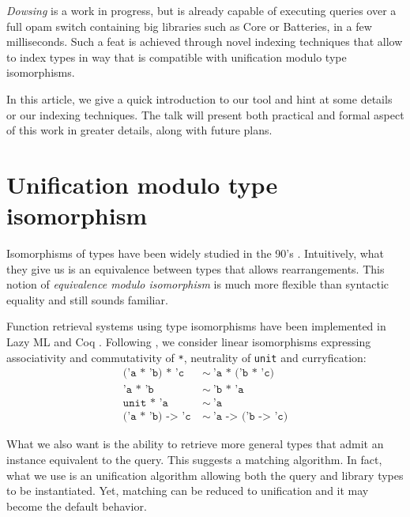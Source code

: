 \documentclass [a4paper,11pt] {scrartcl}
\newcommand {\dowsing} {\textit {Dowsing}\xspace}
\begin{document}
\dowsing is a work in progress, but is already capable of
executing queries over a full opam switch
containing big libraries such as Core or Batteries, in a few milliseconds.
Such a feat is achieved through novel indexing techniques that allow
to index types in way that is compatible with unification modulo type
isomorphisms.

In this article, we give a quick introduction to our tool and hint at some
details or our indexing techniques. The talk will present both practical
and formal aspect of this work in greater details, along with
future plans.



\section {Unification modulo type isomorphism}

Isomorphisms of types have been widely studied in the 90's \cite {dicosmo}. Intuitively, what they give us is an equivalence between types that allows rearrangements. This notion of \textit {equivalence modulo isomorphism} is much more flexible than syntactic equality and still sounds familiar.

Function retrieval systems using type isomorphisms have been implemented in Lazy ML \cite {rittri} and Coq \cite {delahaye}. Following \cite {rittri}, we consider linear isomorphisms expressing associativity and commutativity of \texttt {*}, neutrality of \texttt {unit} and curryfication:
\begin {align*}
  \texttt {('a * 'b) * 'c} &\ \sim\ \texttt {'a * ('b * 'c)} \\
  \texttt {'a * 'b} &\ \sim\ \texttt {'b * 'a} \\
  \texttt {unit * 'a} &\ \sim\ \texttt {'a} \\
  \texttt {('a * 'b) -> 'c} &\ \sim\ \texttt {'a -> ('b -> 'c)}
\end {align*}

What we also want is the ability to retrieve more general types that admit an instance equivalent to the query. This suggests a matching algorithm. In fact, what we use is an unification algorithm \cite {boudet} allowing both the query and library types to be instantiated. Yet, matching can be reduced to unification and it may become the default behavior.
\end{document}
